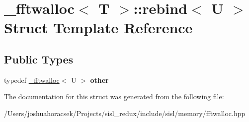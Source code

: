 \hypertarget{struct__fftwalloc_1_1rebind}{}\section{\+\_\+fftwalloc$<$ T $>$\+:\+:rebind$<$ U $>$ Struct Template Reference}
\label{struct__fftwalloc_1_1rebind}
\subsection*{Public Types}
\begin{DoxyCompactItemize}
\item 
\mbox{\label{struct__fftwalloc_1_1rebind_a5fab290f258bbf41f305520df4ee9340}} 
typedef \hyperlink{class__fftwalloc}{\+\_\+fftwalloc}$<$ U $>$ {\bfseries other}
\end{DoxyCompactItemize}


The documentation for this struct was generated from the following file\+:\begin{DoxyCompactItemize}
\item 
/\+Users/joshuahoracsek/\+Projects/sisl\+\_\+redux/include/sisl/memory/fftwalloc.\+hpp\end{DoxyCompactItemize}
